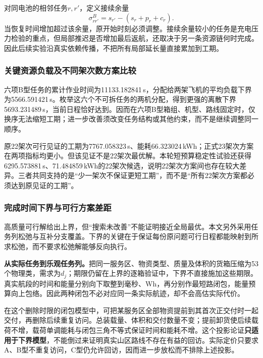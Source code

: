 \documentclass[withoutpreface,colorprint]{format}
\numberwithin{equation}{section}
\numberwithin{figure}{section}
\numberwithin{table}{section}
\begin{document}
对同电池的相邻任务$r,r'$，定义接续余量
\begin{equation}
 \sigma_{rr'}^B=s_{r'}-(s_r+p_r+c_r).
 \label{eq:q2_battery_slack}
\end{equation}
当恢复时间增加超过该余量，原开始时刻必须调整。接续余量较小的任务是充电压力检验的重点，但局部推迟是否增加最后返航，还取决于另一条资源链何时完成。因此后续实验沿真实依赖传播，不把所有局部延长量直接累加到工期。


\subsubsection{关键资源负载及不同架次数方案比较}
六项B型任务的累计作业时间为11133.182841\,s，分配给两架飞机的平均负载下界为5566.591421\,s。枚举这六个不可拆任务的两机分配，得到更强的离散下界5693.231489\,s，当前日程恰好达到。因而在六项B型箱组、机型、路线固定时，仅换序无法缩短工期；进一步改善须改变任务结构或其他约束，而不是继续调整同一顺序。

原22架次可行见证的工期为7767.058323\,s、能耗66.323024\,kWh；正式23架次方案在两项指标均更小。但该见证不是22架次最优解。本轮短预算稳定性试验还获得6295.573881\,s、71.484859\,kWh的22架次候选，说明22架次方案间也存在较大差异。三者共同支持的是“少一架次不保证更短工期”，而不是“所有22架次方案都必须达到原见证的工期”。


\subsubsection{完成时间下界与可行方案差距}
\label{sec:q2_bound_derivation}
高质量可行解给出上界，但“搜索未改善”不能证明接近全局最优。本文另外采用任务列松弛与互补分支覆盖\cite{barnhart1998branchprice}。下界的关键在于保证每份原问题可行日程都能映射到所求松弛，而不要求松弛解能够反向执行。

\textbf{从实际任务到乐观任务列。}把同一服务区、物资类型、质量及体积的货箱压缩为53个物理类，需求为$d_j$；期限仍留在上界的逐箱验证中，下界不直接施加这些期限。真实航段的时间和能量分别向下取整到毫秒、Wh，再分别作最短路闭包，能量预算向上包络。因此两种闭包不必对应同一条实际航迹，却不会高估实际代价。

在这个删除时限的闭包模型中，可把某服务区全部物资提前到其首次正交付时一起交付，再删除后续重复访问。总装载量、体积和交付数量不变；提前卸货使后续载荷不增，载荷单调能耗与闭包三角不等式保证时间和能耗不增。这个投影论证\textbf{只适用于下界模型}，不能倒过来证明真实山区路线不存在有益的回访。实际定价只要求A、B型不重复访问，C型仍允许回访，因而进一步放松而不排除上述投影。
\end{document}
